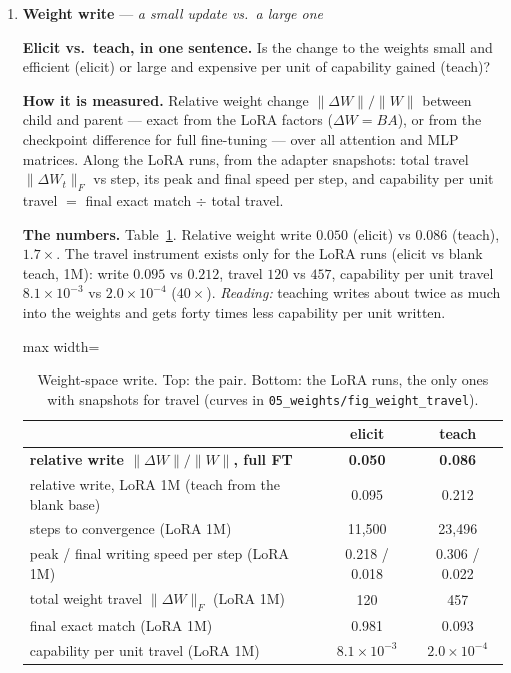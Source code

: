 \documentclass[11pt]{article}
\newcommand{\what}[1]{\par\noindent\textbf{Elicit vs.\ teach, in one sentence.} #1}
\newcommand{\how}[1]{\par\noindent\textbf{How it is measured.} #1}
\newcommand{\numbers}[1]{\par\noindent\textbf{The numbers.} #1\par\medskip}
\newcommand{\metricsec}[2]{\item \textbf{#1} --- \emph{#2}}
\begin{document}
\begin{enumerate}[label=\textbf{M\arabic*}, leftmargin=*, itemsep=1.2em, resume]
\metricsec{Weight write}{a small update vs.\ a large one}
\what{Is the change to the weights small and efficient (elicit) or large and expensive per unit
of capability gained (teach)?}
\how{Relative weight change $\|\Delta W\|/\|W\|$ between child and parent --- exact from the LoRA
factors ($\Delta W = BA$), or from the checkpoint difference for full fine-tuning --- over all
attention and MLP matrices. Along the LoRA runs, from the adapter snapshots: total travel
$\|\Delta W_t\|_F$ vs step, its peak and final speed per step, and capability per unit travel
$=$ final exact match $\div$ total travel.}
\numbers{Table~\ref{tab:weights}. Relative weight write $0.050$ (elicit) vs $0.086$ (teach),
$1.7\times$. The travel instrument exists only
for the LoRA runs (elicit vs blank teach, 1M): write $0.095$ vs $0.212$, travel $120$ vs $457$,
capability per unit travel $8.1\times10^{-3}$ vs $2.0\times10^{-4}$ ($40\times$).
\emph{Reading:} teaching writes about twice as much into the weights and gets forty times less
capability per unit written.}
\begin{table}[h]\centering\small
\begin{adjustbox}{max width=\textwidth}
\begin{tabular}{lcc}
\toprule
 & elicit & teach \\
\midrule
\textbf{relative write $\|\Delta W\|/\|W\|$, full FT} & \textbf{0.050} & \textbf{0.086} \\
\midrule
relative write, LoRA 1M (teach from the blank base) & 0.095 & 0.212 \\
steps to convergence (LoRA 1M) & 11{,}500 & 23{,}496 \\
peak / final writing speed per step (LoRA 1M) & 0.218 / 0.018 & 0.306 / 0.022 \\
total weight travel $\|\Delta W\|_F$ (LoRA 1M) & 120 & 457 \\
final exact match (LoRA 1M) & 0.981 & 0.093 \\
capability per unit travel (LoRA 1M) & $8.1\times10^{-3}$ & $2.0\times10^{-4}$ \\
\bottomrule
\end{tabular}
\end{adjustbox}
\caption{Weight-space write. Top: the pair. Bottom: the LoRA runs, the only ones with snapshots
for travel (curves in \texttt{05\_weights/fig\_weight\_travel}).}
\label{tab:weights}
\end{table}


\end{enumerate}
\end{document}
